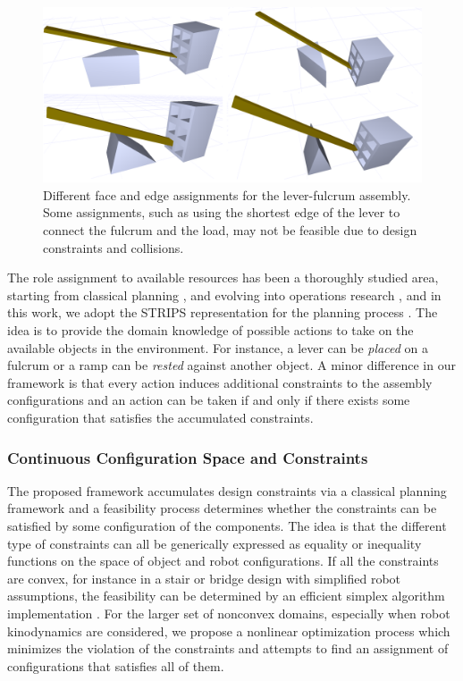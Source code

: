\documentclass[runningheads,a4paper]{llncs}
\begin{document}
\begin{figure}[ht!] 
  \centering
  \includegraphics[width=0.7\linewidth]{Figures/matches.png}
  \caption{Different face and edge assignments for the lever-fulcrum assembly. Some assignments,
  such as using the shortest edge of the lever to connect the fulcrum and the load, may not
  be feasible due to design constraints and collisions.}
  \label{fig:matches}
\end{figure}

The role assignment to available resources has been a thoroughly studied area, starting from
classical planning \cite{newell1961gps,mccarthy1963programs}, and evolving into operations research
\cite{fulkerson1961network,taha1975integer}, and in this work, we adopt the STRIPS representation
for the planning process \cite{fikes1972strips}. The idea is to provide the domain knowledge of possible
actions to take on the available objects in the environment. For instance, a lever can be \textit{placed}
on a fulcrum or a ramp can be \textit{rested} against another object. A minor difference in our
framework is that every action induces additional constraints to the assembly configurations and
an action can be taken if and only if there exists some configuration that satisfies the accumulated
constraints.

\subsubsection{Continuous Configuration Space and Constraints}

The proposed framework accumulates design constraints via a classical planning framework
and a feasibility process determines whether the constraints can be satisfied by some configuration
of the components. The idea is that the different type of constraints can all be generically
expressed as equality or inequality functions on the space of object and robot configurations.
If all the constraints are convex, for instance in a stair or bridge design with simplified
robot assumptions, the feasibility can be determined by an efficient simplex algorithm
implementation \cite{erdogan2013planning}. For the larger set of nonconvex domains, especially when
robot kinodynamics are considered, we propose a nonlinear optimization process which minimizes the
violation of the constraints and attempts to find an assignment of configurations that satisfies all of them.
\end{document}

